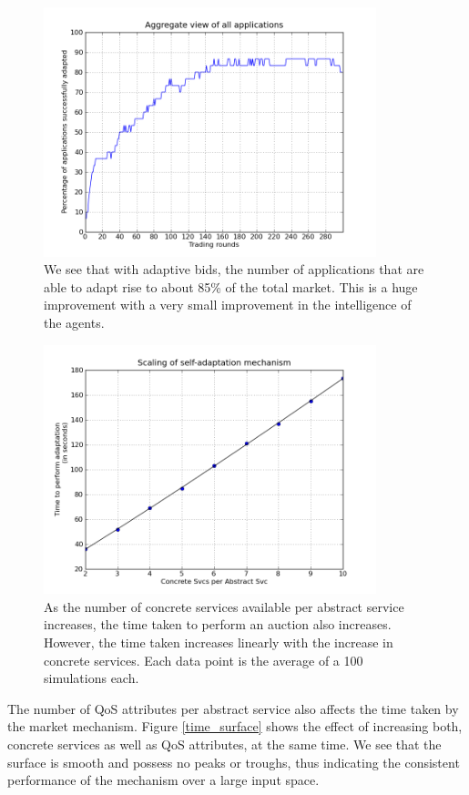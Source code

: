\documentclass[10pt,journal,compsoc]{IEEEtran}
\begin{document}
\begin{figure}
	 \includegraphics[width=3.8in]{graphs/probabilistic-change-to-qa.png}
	 \caption{We see that with adaptive bids, the number of applications that are able to adapt rise to about 85\% of the total market. This is a huge improvement with a very small improvement in the intelligence of the agents.}
	 \label{marketperformance}
       \end{figure} 
\begin{figure}
    \includegraphics[width=3.8in]{graphs/Scaling-Num-ConcSvc-Per-Abstract-Svc.png}
    \caption{As the number of concrete services available per abstract service increases, the time taken to perform an auction also increases. However, the time taken increases linearly with the increase in concrete services. Each data point is the average of a 100 simulations each.}
    \label{svc_scaling}
\end{figure}

The number of QoS attributes per abstract service also affects the time taken by the market mechanism. 
Figure \ref{time_surface} shows the effect of increasing both, concrete services as well as QoS attributes, at the same time. We see that the surface is smooth and possess no peaks or troughs, thus indicating the consistent performance of the mechanism over a large input space. 
\end{document}
